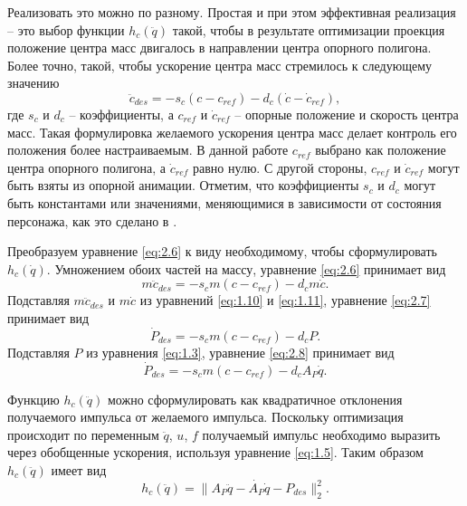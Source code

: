Реализовать это можно по разному. Простая и при этом эффективная реализация -- это выбор функции $h_c(\ddot{q})$ такой, чтобы в результате оптимизации проекция положение центра масс двигалось в направлении центра опорного полигона. Более точно, такой, чтобы ускорение центра масс стремилось к следующему значению
\begin{equation*}
  \ddot{c}_{des} = - s_{c} (c - c_{ref}) - d_{c} (\dot{c} - \dot{c}_{ref}), \tag{2.6}\label{eq:2.6}
\end{equation*}
где $s_{c}$ и $d_{c}$ -- коэффициенты, а $c_{ref}$ и $\dot{c}_{ref}$ -- опорные положение и скорость центра масс. Такая формулировка желаемого ускорения центра масс делает контроль его положения более настраиваемым. В данной работе $c_{ref}$ выбрано как положение центра опорного полигона, а $\dot{c}_{ref}$ равно нулю. С другой стороны, $c_{ref}$ и $\dot{c}_{ref}$ могут быть взяты из опорной анимации. Отметим, что коэффициенты $s_{c}$ и $d_{c}$ могут быть константами или значениями, меняющимися в зависимости от состояния персонажа, как это сделано в \cite{AbeSP}.


Преобразуем уравнение \ref{eq:2.6} к виду необходимому, чтобы сформулировать $h_c(\dot{q})$. Умножением обоих частей на массу, уравнение \ref{eq:2.6} принимает вид
\begin{equation*}
  m \ddot{c}_{des} = - s_{c} m (c - c_{ref}) - d_{c} m \dot{c}. \tag{2.7}\label{eq:2.7}
\end{equation*}
Подставляя $m \ddot{c}_{des}$ и $m \dot{c}$ из уравнений \ref{eq:1.10} и \ref{eq:1.11}, уравнение \ref{eq:2.7} принимает вид
\begin{equation*}
  \dot{P}_{des} = - s_{c} m (c - c_{ref}) - d_{c} P. \tag{2.8}\label{eq:2.8}
\end{equation*}
Подставляя $P$ из уравнения \ref{eq:1.3}, уравнение \ref{eq:2.8} принимает вид
\begin{equation*}
  \dot{P}_{des} = - s_{c} m (c - c_{ref}) - d_{c} A_{P} \dot{q}. \tag{2.9}\label{eq:2.9}
\end{equation*}

Функцию $h_c(\ddot{q})$ можно сформулировать как квадратичное отклонения получаемого импульса от желаемого импульса. Поскольку оптимизация происходит по переменным $\ddot{q}$, $u$, $f$ получаемый импульс необходимо выразить через обобщенные ускорения, используя уравнение \ref{eq:1.5}. Таким образом $h_c(\ddot{q})$ имеет вид
\begin{equation*}
  h_{c}(\ddot{q}) = \lVert A_{P}\ddot{q} - \dot{A_{P}} \dot{q} - P_{des} \rVert_{2}^{2}. \tag{2.10}\label{eq:2.10}
\end{equation*}


